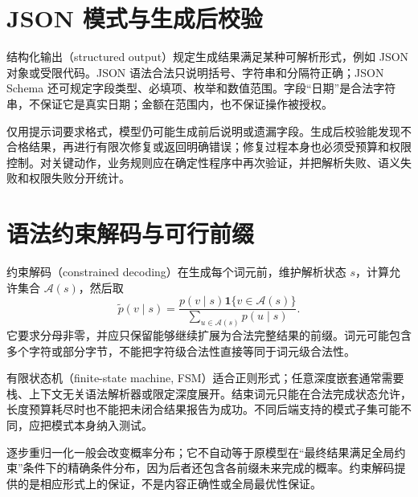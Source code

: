 \section{JSON 模式与生成后校验}

结构化输出（structured output）规定生成结果满足某种可解析形式，例如 JSON 对象或受限代码。JSON 语法合法只说明括号、字符串和分隔符正确；JSON Schema 还可规定字段类型、必填项、枚举和数值范围。字段“日期”是合法字符串，不保证它是真实日期；金额在范围内，也不保证操作被授权。

仅用提示词要求格式，模型仍可能生成前后说明或遗漏字段。生成后校验能发现不合格结果，再进行有限次修复或返回明确错误；修复过程本身也必须受预算和权限控制。对关键动作，业务规则应在确定性程序中再次验证，并把解析失败、语义失败和权限失败分开统计。

\section{语法约束解码与可行前缀}

约束解码（constrained decoding）在生成每个词元前，维护解析状态 $s$，计算允许集合 $\mathcal A(s)$，然后取
\begin{equation}
\widetilde p(v\mid s)=\frac{p(v\mid s)\mathbf1\{v\in\mathcal A(s)\}}{
\sum_{u\in\mathcal A(s)}p(u\mid s)}.
\label{eq:constrained}
\end{equation}
它要求分母非零，并应只保留能够继续扩展为合法完整结果的前缀。词元可能包含多个字符或部分字节，不能把字符级合法性直接等同于词元级合法性。

有限状态机（finite-state machine, FSM）适合正则形式；任意深度嵌套通常需要栈、上下文无关语法解析器或限定深度展开。结束词元只能在合法完成状态允许，长度预算耗尽时也不能把未闭合结果报告为成功。不同后端支持的模式子集可能不同，应把模式本身纳入测试。

逐步重归一化一般会改变概率分布；它不自动等于原模型在“最终结果满足全局约束”条件下的精确条件分布，因为后者还包含各前缀未来完成的概率。约束解码提供的是相应形式上的保证，不是内容正确性或全局最优性保证。

